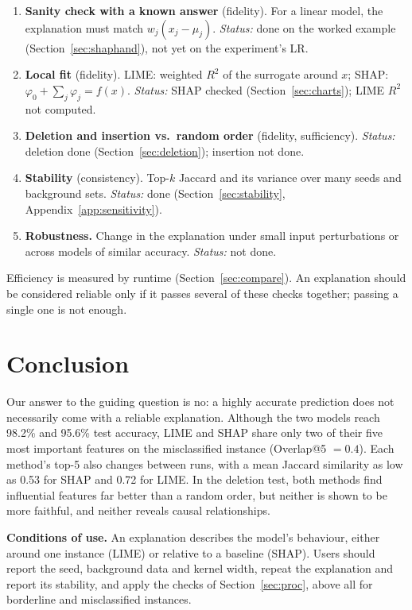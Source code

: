 \documentclass[11pt,a4paper]{article}
\begin{document}
\begin{enumerate}
  \item \textbf{Sanity check with a known answer} (fidelity). For a linear
        model, the explanation must match $w_j (x_j - \mu_j)$. \emph{Status:}
        done on the worked example (Section~\ref{sec:shaphand}), not yet on
        the experiment's LR.
  \item \textbf{Local fit} (fidelity). LIME: weighted $R^2$ of the surrogate
        around $x$; SHAP: $\varphi_0 + \sum_j \varphi_j = f(x)$.
        \emph{Status:} SHAP checked (Section~\ref{sec:charts}); LIME $R^2$
        not computed.
  \item \textbf{Deletion and insertion vs.\ random order} (fidelity,
        sufficiency). \emph{Status:} deletion done
        (Section~\ref{sec:deletion}); insertion not done.
  \item \textbf{Stability} (consistency). Top-$k$ Jaccard and its variance
        over many seeds and background sets. \emph{Status:} done
        (Section~\ref{sec:stability}, Appendix~\ref{app:sensitivity}).
  \item \textbf{Robustness.} Change in the explanation under small input
        perturbations or across models of similar accuracy.
        \emph{Status:} not done.
\end{enumerate}

Efficiency is measured by runtime (Section~\ref{sec:compare}). An explanation
should be considered reliable only if it passes several of these checks
together; passing a single one is not enough.

\section{Conclusion}
Our answer to the guiding question is no: a highly accurate prediction does
not necessarily come with a reliable explanation. Although the two models
reach 98.2\% and 95.6\% test accuracy, LIME and SHAP share only two of their
five most important features on the misclassified instance (Overlap@5 $=0.4$).
Each method's top-5 also changes between runs, with a mean Jaccard similarity
as low as 0.53 for SHAP and 0.72 for LIME. In the deletion test, both methods
find influential features far better than a random order, but neither is
shown to be more faithful, and neither reveals causal relationships.

\textbf{Conditions of use.} An explanation describes the model's behaviour,
either around one instance (LIME) or relative to a baseline (SHAP). Users
should report the seed, background data and kernel width, repeat the
explanation and report its stability, and apply the checks of
Section~\ref{sec:proc}, above all for borderline and misclassified instances.
\end{document}
